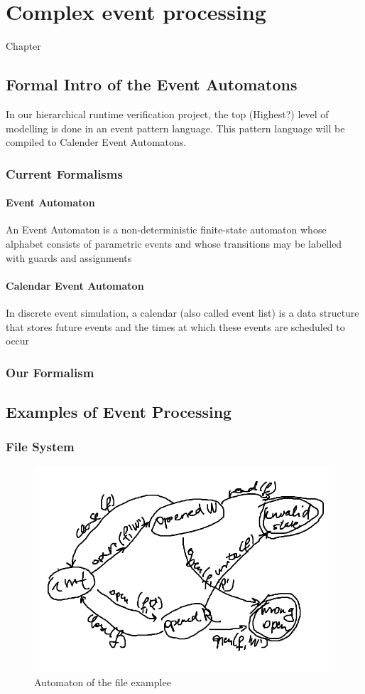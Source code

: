 \chapter{Complex event processing}
\label{chap:cep}

Chapter
\section{Formal Intro of the Event Automatons}
	In our hierarchical runtime verification project, the top (Highest?) level of modelling is done in an event pattern language.
	This pattern language will be compiled to Calender Event Automatons.
	\subsection{Current Formalisms}
		\subsubsection{Event Automaton}
			An Event Automaton is a non-deterministic finite-state automaton whose alphabet consists
			of parametric events and whose transitions may be labelled with guards and assignments
		\subsubsection{Calendar Event Automaton}
			In discrete event simulation, a calendar (also called event list) is a data structure that
			stores future events and the times at which these events are scheduled to occur
			
	\subsection{Our Formalism}

\section{Examples of Event Processing}

	\subsection{File System}
	\begin{figure}[h]
	\centering
	\includegraphics[width=0.5\linewidth]{include/figures/chapter_5/fileautomaton}
	\caption{Automaton of the file examplee}
	\label{fig:cep:fileautomaton}
	\end{figure}

